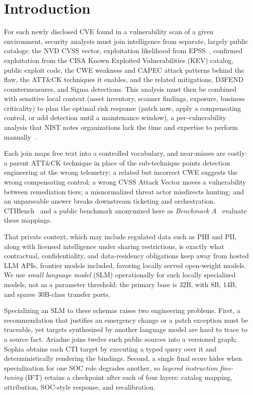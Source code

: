 \documentclass[conference]{IEEEtran}
\begin{document}
\section{Introduction}
For each newly disclosed CVE found in a vulnerability scan of a given environment, security analysts must join intelligence from separate, largely public catalogs: the NVD CVSS vector, exploitation likelihood from EPSS~\cite{jacobs2021epss}, confirmed exploitation from the CISA Known Exploited Vulnerabilities (KEV) catalog, public exploit code, the CWE weakness and CAPEC attack patterns behind the flaw, the ATT\&CK techniques it enables, and the related mitigations, D3FEND countermeasures, and Sigma detections. This analysis must then be combined with sensitive local context (asset inventory, scanner findings, exposure, business criticality) to plan the optimal risk response (patch now, apply a compensating control, or add detection until a maintenance window), a per-vulnerability analysis that NIST notes organizations lack the time and expertise to perform manually~\cite{nist80040r4}.

Each join maps free text into a controlled vocabulary, and near-misses are costly: a parent ATT\&CK technique in place of the sub-technique points detection engineering at the wrong telemetry; a related but incorrect CWE suggests the wrong compensating control; a wrong CVSS Attack Vector moves a vulnerability between remediation tiers; a misnormalized threat actor misdirects hunting; and an unparseable answer breaks downstream ticketing and orchestration. CTIBench~\cite{ctibench} and a public benchmark anonymized here as \emph{Benchmark A}~\cite{anonbench} evaluate these mappings.

That private context, which may include regulated data such as PHI and PII, along with licensed intelligence under sharing restrictions, is exactly what contractual, confidentiality, and data-residency obligations keep away from hosted LLM APIs, frontier models included, favoring locally served open-weight models. We use \emph{small language model} (SLM) operationally for such locally specialized models, not as a parameter threshold: the primary base is 32B, with 8B, 14B, and sparse 30B-class transfer ports.

Specializing an SLM to these schemas raises two engineering problems. First, a recommendation that justifies an emergency change or a patch exception must be traceable, yet targets synthesized by another language model are hard to trace to a source fact. Ariadne joins twelve such public sources into a versioned graph; Sophia obtains each CTI target by executing a typed query over it and deterministically rendering the bindings. Second, a single final score hides when specialization for one SOC role degrades another, so \emph{layered instruction fine-tuning} (IFT) retains a checkpoint after each of four layers: catalog mapping, attribution, SOC-style response, and recalibration.
\end{document}
